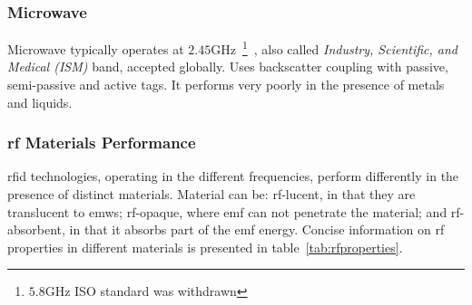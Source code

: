 \subsubsection{Microwave}

Microwave typically operates at $2.45$GHz~\footnote{$5.8$GHz ISO standard was withdrawn}~\cite{isoISOIEC180004}, also called \emph{Industry, Scientific, and Medical (ISM)} band, accepted globally. Uses backscatter coupling with passive, semi-passive and active tags. It performs very poorly in the presence of metals and liquids.

\subsubsection{\ac{rf} Materials Performance}

\ac{rfid} technologies, operating in the different frequencies, perform differently in the presence of distinct materials.
Material can be: \acs{rf}-lucent, in that they are translucent to \acp{emw}; \acs{rf}-opaque, where \ac{emf} can not penetrate the material; and \acs{rf}-absorbent, in that it absorbs part of the \ac{emf} energy.
Concise information on \ac{rf} properties in different materials is presented in table~\ref{tab:rfproperties}.

